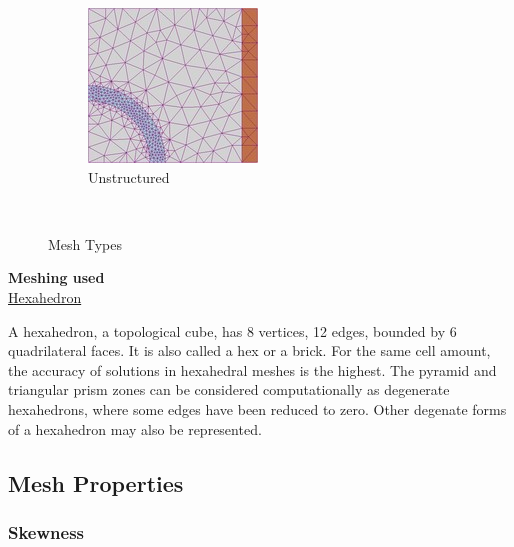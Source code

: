 \begin{figure}[h]
\begin{subfigure}[b]{0.3\textwidth}
                \includegraphics[width=\textwidth]{106.jpg}
                \caption{Unstructured}
                \label{fig:unstructured}
        \end{subfigure}
        ~ %

        \caption{Mesh Types}\label{fig:Meshing}
\end{figure}

\textbf{Meshing used}
\\
\underline{Hexahedron}


 A hexahedron, a topological cube, has 8 vertices, 12 edges, bounded by 6 quadrilateral faces. It is also called a hex or a brick. For the same cell amount, the accuracy of solutions in hexahedral meshes is the highest.
The pyramid and triangular prism zones can be considered computationally as degenerate hexahedrons, where some edges have been reduced to zero. Other degenate forms of a hexahedron may also be represented.

\subsection{Mesh Properties}

\subsubsection{Skewness}

